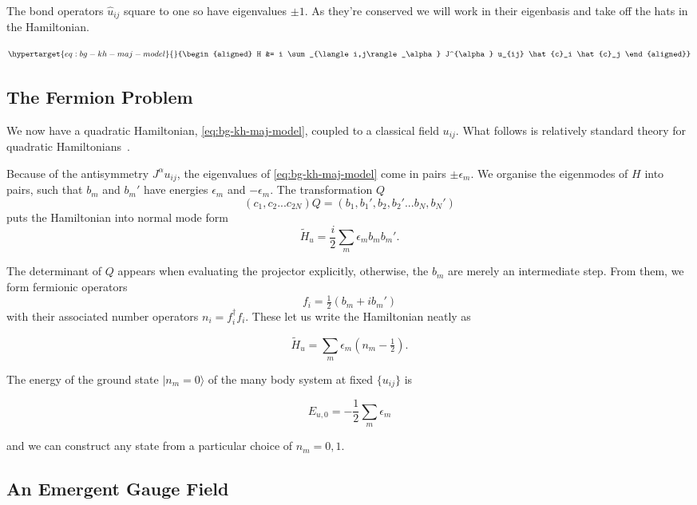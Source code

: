 The bond operators \(\hat{u}_{ij}\) square to one so have eigenvalues \(\pm1\). As they're conserved we will work in their eigenbasis and take off the hats in the Hamiltonian.

\begin{equation}\protect\hypertarget{eq:bg-kh-maj-model}{}{\begin{aligned}
H &=  i \sum_{\langle i,j\rangle_\alpha} J^{\alpha} u_{ij} \hat{c}_i \hat{c}_j
\end{aligned}}\label{eq:bg-kh-maj-model}\end{equation}

\hypertarget{the-fermion-problem}{%
\subsection{The Fermion Problem}\label{the-fermion-problem}}

We now have a quadratic Hamiltonian, \cref{eq:bg-kh-maj-model}, coupled to a classical field \(u_{ij}\). What follows is relatively standard theory for quadratic Hamiltonians~\autocite{BlaizotRipka1986}.

Because of the antisymmetry \(J^{\alpha} u_{ij}\), the eigenvalues of \cref{eq:bg-kh-maj-model} come in pairs \(\pm \epsilon_m\). We organise the eigenmodes of \(H\) into pairs, such that \(b_m\) and \(b_m'\) have energies \(\epsilon_m\) and \(-\epsilon_m\). The transformation \(Q\) \[(c_1, c_2... c_{2N}) Q = (b_1, b_1', b_2, b_2' ... b_{N}, b_{N}')\] puts the Hamiltonian into normal mode form \[\tilde{H}_u = \frac{i}{2} \sum_m \epsilon_m b_m b_m'.\]

The determinant of \(Q\) appears when evaluating the projector explicitly, otherwise, the \(b_m\) are merely an intermediate step. From them, we form fermionic operators \[ f_i = \tfrac{1}{2} (b_m + ib_m')\] with their associated number operators \(n_i = f^\dagger_i f_i\). These let us write the Hamiltonian neatly as

\[ \tilde{H}_u = \sum_m \epsilon_m (n_m - \tfrac{1}{2}).\]

The energy of the ground state \(|n_m = 0\rangle\) of the many body system at fixed \(\{u_{ij}\}\) is

\[E_{u,0} = -\frac{1}{2}\sum_m \epsilon_m \]

and we can construct any state from a particular choice of \(n_m = 0,1\).

\hypertarget{an-emergent-gauge-field}{%
\subsection{An Emergent Gauge Field}\label{an-emergent-gauge-field}}

